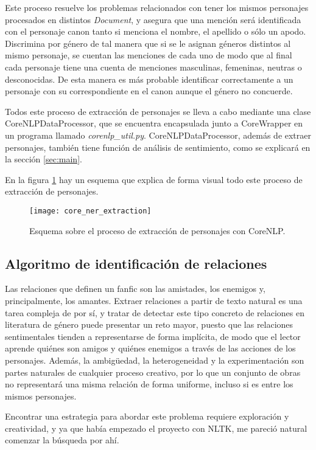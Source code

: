 \documentclass{pre-tfg}
\begin{document}
Este proceso resuelve los problemas relacionados con tener los mismos personajes procesados en distintos \textit{Document}, y asegura que una mención será identificada con el personaje canon tanto si menciona el nombre, el apellido o sólo un apodo. Discrimina por género de tal manera que si se le asignan géneros distintos al mismo personaje, se cuentan las menciones de cada uno de modo que al final cada personaje tiene una cuenta de menciones masculinas, femeninas, neutras o desconocidas. De esta manera es más probable identificar correctamente a un personaje con su correspondiente en el canon aunque el género no concuerde.

Todos este proceso de extracción de personajes se lleva a cabo mediante una clase CoreNLPDataProcessor, que se encuentra encapsulada junto a CoreWrapper en un programa llamado \textit{corenlp\_util.py}. CoreNLPDataProcessor, además de extraer personajes, también tiene función de análisis de sentimiento, como se explicará en la sección \ref{sec:main}.

En la figura \ref{fig:ner_extraction_corenlp} hay un esquema que explica de forma visual todo este proceso de extracción de personajes.

\begin{figure}[!h]
	\centering
	\texttt{[image: core\_ner\_extraction]}
	\caption{Esquema sobre el proceso de extracción de personajes con CoreNLP.}
	\label{fig:ner_extraction_corenlp}
\end{figure}


\subsection{Algoritmo de identificación de relaciones}

Las relaciones que definen un fanfic son las amistades, los enemigos y, principalmente, los amantes. Extraer relaciones a partir de texto natural es una tarea compleja de por sí, y tratar de detectar este tipo concreto de relaciones en literatura de género puede presentar un reto mayor, puesto que las relaciones sentimentales tienden a representarse de forma implícita, de modo que el lector aprende quiénes son amigos y quiénes enemigos a través de las acciones de los personajes. Además, la ambigüedad, la heterogeneidad y la experimentación son partes naturales de cualquier proceso creativo, por lo que un conjunto de obras no representará una misma relación de forma uniforme, incluso si es entre los mismos personajes.

Encontrar una estrategia para abordar este problema requiere exploración y creatividad, y ya que había empezado el proyecto con NLTK, me pareció natural comenzar la búsqueda por ahí.
\end{document}
